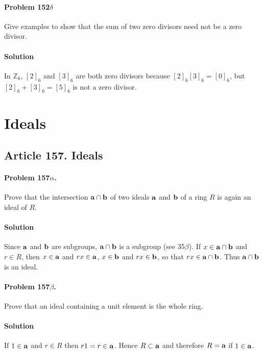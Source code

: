\paragraph{Problem 152$\delta$}
Give examples to show that the sum of two zero divisors need not be a zero
divisor.

\paragraph*{Solution}
In $\mathbb{Z}_6$, $[2]_6$ and $[3]_6$ are both zero divisors because
$[2]_6 [3]_6 = [0]_6$, but $[2]_6  + [3]_6 = [5]_6$ is not a zero
divisor.


\section{Ideals}

\subsection{Article 157. Ideals}

\paragraph{Problem 157$\alpha$.}
Prove that the intersection $ \mathsf{\mathbf{a}} \cap \mathsf{\mathbf{b}} $ of two ideals $\mathsf{\mathbf{a}}$
and $\mathsf{\mathbf{b}}$ of a ring $R$ is again an ideal of $R$.

\paragraph*{Solution}
Since $\mathsf{\mathbf{a}}$ and $\mathsf{\mathbf{b}}$ are subgroups, $\mathsf{\mathbf{a}} \cap \mathsf{\mathbf{b}}$ is a
subgroup (see 35$\beta$). If $ x \in \mathsf{\mathbf{a}} \cap \mathsf{\mathbf{b}}$ and $ r \in R $,
then $x \in \mathsf{\mathbf{a}} $ and $ rx \in \mathsf{\mathbf{a}}$, $ x \in \mathsf{\mathbf{b}}$ and $ rx \in
\mathsf{\mathbf{b}}$, so that $ rx \in \mathsf{\mathbf{a}} \cap \mathsf{\mathbf{b}}$.  Thus $ \mathsf{\mathbf{a}} \cap
\mathsf{\mathbf{b}} $ is an ideal.

\paragraph{Problem 157$\beta$.}
Prove that an ideal containing a unit element is the whole ring.

\paragraph*{Solution}
If $ 1 \in \mathsf{\mathbf{a}} $ and $r \in R$ then $ r1 = r \in \mathsf{\mathbf{a}}$. Hence $R
\subset \mathsf{\mathbf{a}}$ and therefore $ R = \mathsf{\mathbf{a}}$ if $ 1 \in \mathsf{\mathbf{a}}$.

